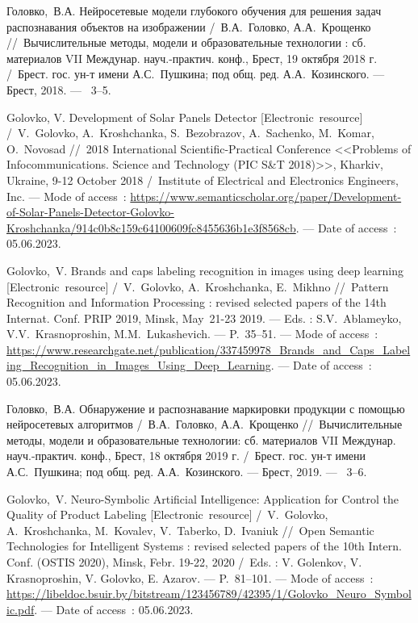 Головко,~В.А. Нейросетевые модели глубокого обучения для решения задач распознавания объектов на изображении /~В.А.~Головко, А.А.~Крощенко
\newblock //~Вычислительные методы, модели и образовательные технологии : сб. материалов VII Междунар. науч.-практич. конф., Брест, 19 октября 2018 г.
\newblock /~Брест. гос. ун-т имени А.С.~Пушкина; под общ. ред. А.А.~Козинского. ---
\newblock Брест, 2018. ---
~3--5. 

Golovko, V. Development of Solar Panels Detector [Electronic~resource] /~V.~Golovko, A.~Kroshchanka, S.~Bezobrazov, A.~Sachenko, M.~Komar, O.~Novosad
\newblock //~2018 International Scientific-Practical Conference <<Problems of Infocommunications. Science and Technology (PIC S\&T 2018)>>, Kharkiv, Ukraine, 9-12 October 2018
\newblock /~Institute of Electrical and Electronics Engineers, Inc. ---
\newblock Mode of access~: \url{https://www.semanticscholar.org/paper/Development-of-Solar-Panels-Detector-Golovko-Kroshchanka/914c0b8c159c64100609fc8455636b1e3f8568cb}. ---
\newblock Date of access~: 05.06.2023.

Golovko,~V. Brands and caps labeling recognition in images using deep learning [Electronic~resource] /~V.~Golovko, A.~Kroshchanka, E.~Mikhno
\newblock //~Pattern Recognition and Information Processing : revised selected papers of the 14th Internat. Conf. PRIP 2019, Minsk, May~21-23 2019. ---
\newblock Eds. : S.V.~Ablameyko, V.V.~Krasnoproshin, M.M.~Lukashevich. ---
\newblock P.~35--51. ---
\newblock Mode of access~: \url{https://www.researchgate.net/publication/337459978_Brands_and_Caps_Labeling_Recognition_in_Images_Using_Deep_Learning}. ---
\newblock Date of access~: 05.06.2023.

Головко,~В.А. Обнаружение и распознавание маркировки продукции с помощью нейросетевых алгоритмов /~В.А.~Головко, А.А.~Крощенко
\newblock //~Вычислительные методы, модели и образовательные технологии: сб. материалов VII Междунар. науч.-практич. конф., Брест, 18 октября 2019 г.
\newblock /~Брест. гос. ун-т имени А.С.~Пушкина; под общ. ред. А.А.~Козинского. ---
\newblock Брест, 2019. ---
~3--6. 

Golovko,~V. Neuro-Symbolic Artificial Intelligence: Application for Control the Quality of Product Labeling [Electronic~resource] /~V.~Golovko, A.~Kroshchanka, M.~Kovalev, V.~Taberko, D.~Ivaniuk
\newblock //~Open Semantic Technologies for Intelligent Systems : revised selected papers of the 10th Intern. Conf. (OSTIS 2020), Minsk, Febr. 19-22, 2020
\newblock /~Eds. : V. Golenkov, V. Krasnoproshin, V. Golovko, E. Azarov. ---
\newblock P.~81--101. ---
\newblock Mode of access~: \url{https://libeldoc.bsuir.by/bitstream/123456789/42395/1/Golovko_Neuro_Symbolic.pdf}. ---
\newblock Date of access~: 05.06.2023.

